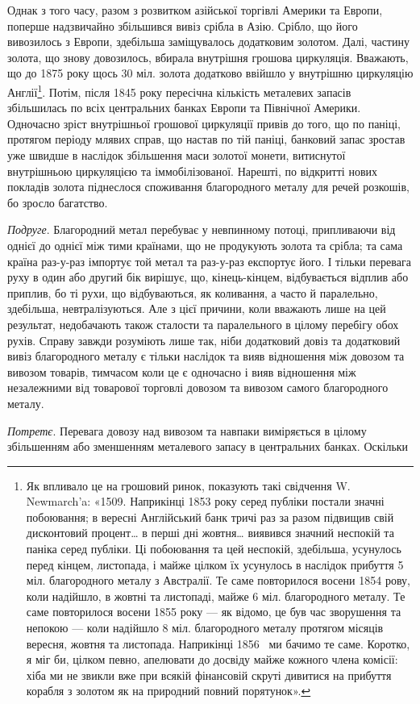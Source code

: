 Однак з того часу, разом з розвитком азійської торгівлі Америки та Европи,
поперше надзвичайно збільшився вивіз срібла в Азію. Срібло, що його вивозилось
з Европи, здебільша заміщувалось додатковим золотом. Далі, частину золота,
що знову довозилось, вбирала внутрішня грошова циркуляція. Вважають, що до
1875 року щось 30 міл. золота додатково ввійшло у внутрішню циркуляцію Англії\footnote{Як впливало це на грошовий ринок, показують такі свідчення W. Newmarch’a: «1509.
Наприкінці 1853 року серед публіки постали значні побоювання; в вересні Англійський банк тричі
раз за разом підвищив свій дисконтовий процент\dots{} в перші дні жовтня\dots{} виявився значний неспокій
та паніка серед публіки. Ці побоювання та цей неспокій, здебільша, усунулось перед кінцем,
листопада, і майже цілком їх усунулось в наслідок прибуття 5 міл. благородного металу з Австралії.
Те саме повторилося восени 1854 рову, коли надійшло, в жовтні та листопаді, майже 6 міл.
благородного металу. Те саме повторилося восени 1855 року — як відомо, це був час зворушення та
непокою — коли надійшло 8 міл. благородного металу протягом місяців вересня, жовтня та листопада.
Наприкінці 1856~ ми бачимо те саме. Коротко, я міг би, цілком певно, апелювати до досвіду майже
кожного члена комісії: хіба ми не звикли вже при всякій фінансовій скруті дивитися на прибуття
корабля з золотом як на природний повний порятунок».}.
Потім, після 1845 року пересічна кількість металевих запасів збільшилась по всіх
центральних банках Европи та Північної Америки. Одночасно зріст внутрішньої
грошової циркуляції привів до того, що по паніці, протягом періоду млявих
справ, що настав по тій паніці, банковий запас зростав уже швидше в наслідок
збільшення маси золотої монети, витиснутої внутрішньою циркуляцією та іммобілізованої.
Нарешті, по відкритті нових покладів золота піднеслося споживання
благородного металу для речей розкошів, бо зросло багатство.

\emph{Подруге}. Благородний метал перебуває у невпинному потоці, припливаючи
від однієї до однієї між тими країнами, що не продукують золота та
срібла; та сама країна раз-у-раз імпортує той метал та раз-у-раз експортує
його. І тільки перевага руху в один або другий бік вирішує, що, кінець-кінцем,
відбувається відплив або приплив, бо ті рухи, що відбуваються, як коливання,
а часто й паралельно, здебільша, невтралізуються. Але з цієї причини,
коли вважають лише на цей результат, недобачають також сталости та паралельного
в цілому перебігу обох рухів. Справу завжди розуміють лише так, ніби
додатковий довіз та додатковий вивіз благородного металу є тільки наслідок та
вияв відношення між довозом та вивозом товарів, тимчасом коли це є одночасно
і вияв відношення між незалежними від товарової торговлі довозом та вивозом
самого благородного металу.

\emph{Потретє}. Перевага довозу над вивозом та навпаки виміряється в цілому
збільшенням або зменшенням металевого запасу в центральних банках. Оскільки
\parbreak{}  %
